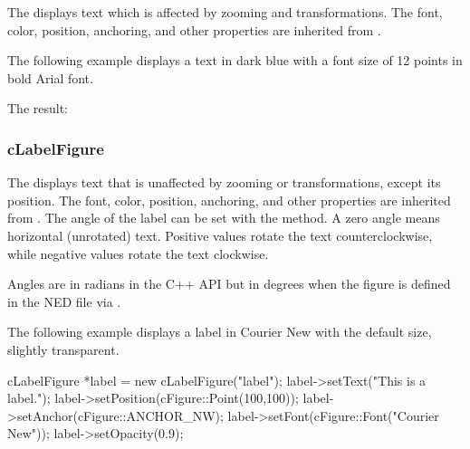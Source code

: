 The  displays text which is affected by zooming and
transformations. The font, color, position, anchoring, and other properties are
inherited from .

The following example displays a text in dark blue with a font size of 12 points
in bold Arial font.



The result:

\begin{center}

\end{center}


\subsubsection{cLabelFigure}
\label{sec:graphics:labelfigure}

The  displays text that is unaffected by zooming or
transformations, except its position. The font, color, position, anchoring, and
other properties are inherited from . The angle of
the label can be set with the  method. A zero angle means
horizontal (unrotated) text. Positive values rotate the text counterclockwise,
while negative values rotate the text clockwise.

\begin{note}
Angles are in radians in the C++ API but in degrees when the figure is defined
in the NED file via .
\end{note}

The following example displays a label in Courier New with the default size, slightly transparent.

\begin{cpp}
cLabelFigure *label = new cLabelFigure("label");
label->setText("This is a label.");
label->setPosition(cFigure::Point(100,100));
label->setAnchor(cFigure::ANCHOR_NW);
label->setFont(cFigure::Font("Courier New"));
label->setOpacity(0.9);
\end{cpp}

